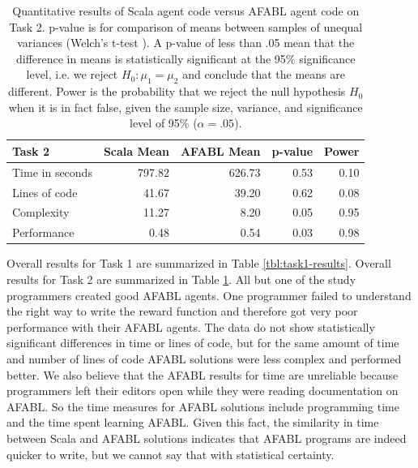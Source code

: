 \begin{center}
\begin{table}[h]
\begin{center}

\begin{tabular}{|l|r|r|r|r|}\hline
Task 2 & Scala Mean & AFABL Mean & p-value & Power \\\hline
Time in seconds & 797.82 & 626.73 & 0.53 & 0.10\\
Lines of code & 41.67 & 39.20 & 0.62 & 0.08\\
Complexity & 11.27 & 8.20 & 0.05 & 0.95\\
Performance & 0.48 & 0.54 & 0.03 & 0.98\\
\hline
\end{tabular}

\end{center}
\caption{Quantitative results of Scala agent code versus AFABL agent code on Task 2. p-value is for comparison of means between samples of unequal variances (Welch's t-test \cite{welch1947generalization}). A p-value of less than .05 mean that the difference in means is statistically significant at the 95\% significance level, i.e. we reject $H_0: \mu_1 = \mu_2$ and conclude that the means are different. Power is the probability that we reject the null hypothesis $H_0$ when it is in fact false, given the sample size, variance, and significance level of 95\% ($\alpha = .05$).}
\label{tbl:task2-results}
\end{table}
\end{center}


Overall results for Task 1 are summarized in Table \ref{tbl:task1-results}. Overall results for Task 2 are summarized in Table \ref{tbl:task2-results}. All but one of the study programmers created good AFABL agents. One programmer failed to understand the right way to write the reward function and therefore got very poor performance with their AFABL agents. The data do not show statistically significant differences in time or lines of code, but for the same amount of time and number of lines of code AFABL solutions were less complex and performed better. We also believe that the AFABL results for time are unreliable because programmers left their editors open while they were reading documentation on AFABL. So the time measures for AFABL solutions include programming time and the time spent learning AFABL. Given this fact, the similarity in time between Scala and AFABL solutions indicates that AFABL programs are indeed quicker to write, but we cannot say that with statistical certainty.


